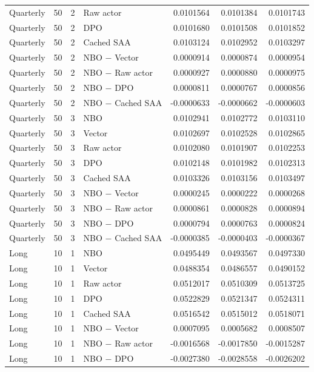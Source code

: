 \begin{longtable}{llrlrrr}
Quarterly & 50 & 2 & Raw actor & 0.0101564 & 0.0101384 & 0.0101743 \\
Quarterly & 50 & 2 & DPO & 0.0101680 & 0.0101508 & 0.0101852 \\
Quarterly & 50 & 2 & Cached SAA & 0.0103124 & 0.0102952 & 0.0103297 \\
Quarterly & 50 & 2 & NBO $-$ Vector & 0.0000914 & 0.0000874 & 0.0000954 \\
Quarterly & 50 & 2 & NBO $-$ Raw actor & 0.0000927 & 0.0000880 & 0.0000975 \\
Quarterly & 50 & 2 & NBO $-$ DPO & 0.0000811 & 0.0000767 & 0.0000856 \\
Quarterly & 50 & 2 & NBO $-$ Cached SAA & -0.0000633 & -0.0000662 & -0.0000603 \\
Quarterly & 50 & 3 & NBO & 0.0102941 & 0.0102772 & 0.0103110 \\
Quarterly & 50 & 3 & Vector & 0.0102697 & 0.0102528 & 0.0102865 \\
Quarterly & 50 & 3 & Raw actor & 0.0102080 & 0.0101907 & 0.0102253 \\
Quarterly & 50 & 3 & DPO & 0.0102148 & 0.0101982 & 0.0102313 \\
Quarterly & 50 & 3 & Cached SAA & 0.0103326 & 0.0103156 & 0.0103497 \\
Quarterly & 50 & 3 & NBO $-$ Vector & 0.0000245 & 0.0000222 & 0.0000268 \\
Quarterly & 50 & 3 & NBO $-$ Raw actor & 0.0000861 & 0.0000828 & 0.0000894 \\
Quarterly & 50 & 3 & NBO $-$ DPO & 0.0000794 & 0.0000763 & 0.0000824 \\
Quarterly & 50 & 3 & NBO $-$ Cached SAA & -0.0000385 & -0.0000403 & -0.0000367 \\
Long & 10 & 1 & NBO & 0.0495449 & 0.0493567 & 0.0497330 \\
Long & 10 & 1 & Vector & 0.0488354 & 0.0486557 & 0.0490152 \\
Long & 10 & 1 & Raw actor & 0.0512017 & 0.0510309 & 0.0513725 \\
Long & 10 & 1 & DPO & 0.0522829 & 0.0521347 & 0.0524311 \\
Long & 10 & 1 & Cached SAA & 0.0516542 & 0.0515012 & 0.0518071 \\
Long & 10 & 1 & NBO $-$ Vector & 0.0007095 & 0.0005682 & 0.0008507 \\
Long & 10 & 1 & NBO $-$ Raw actor & -0.0016568 & -0.0017850 & -0.0015287 \\
Long & 10 & 1 & NBO $-$ DPO & -0.0027380 & -0.0028558 & -0.0026202 \\

\end{longtable}
